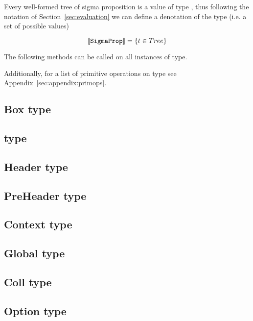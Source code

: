 Every well-formed tree of sigma proposition is a value of type
, thus following the notation of Section~\ref{sec:evaluation}
we can define a denotation of the  type (i.e. a set of possible values)

$$\Denot{\lst{SigmaProp}} = \Set{t \in Tree}$$


The following methods can be called on all instances of  type.



Additionally, for a list of primitive operations on  type see
Appendix~\ref{sec:appendix:primops}.

\subsection{Box type}
\label{sec:type:Box}
 

\subsection{ type}
\label{sec:type:AvlTree}
 

\subsection{Header type}
\label{sec:type:Header}
 

\subsection{PreHeader type}
\label{sec:type:PreHeader}
 

\subsection{Context type}
\label{sec:type:Context}


\subsection{Global type}
\label{sec:type:Global}


\subsection{Coll type}
\label{sec:type:Coll}
 

\subsection{Option type}
\label{sec:type:Option}

